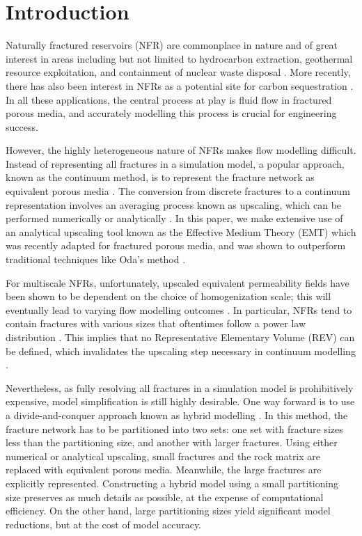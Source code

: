 \documentclass[a4paper]{article}
\begin{document}
\section{Introduction}
Naturally fractured reservoirs (NFR) are commonplace in nature and of great interest in areas including but not limited to hydrocarbon extraction, geothermal resource exploitation, and containment of nuclear waste disposal \cite{Berkowitz2002}. More recently, there has also been 
interest in NFRs as a potential site for carbon sequestration \cite{March2018}. In all these applications, the central process at play is fluid flow in fractured porous media, and accurately modelling this process is crucial for engineering success.

However, the highly heterogeneous nature of NFRs makes flow modelling difficult. Instead of representing all fractures in a simulation model, a popular approach, known as the continuum method, is to represent the fracture network as equivalent porous media \cite{Ezulike2013, Warren1963, Yan2016}. The conversion from discrete fractures to a continuum representation involves an averaging process known as upscaling, which can be performed numerically or analytically \cite{Durlofsky1991,Oda1985,Renard1997,Saevik2013}. In this paper, we make extensive use of an analytical upscaling tool known as the Effective Medium Theory (EMT) which was recently adapted for fractured porous media, and was shown to outperform traditional techniques like Oda's method \cite{Oda1985, Saevik2013, Saevik2014}. 

For multiscale NFRs, unfortunately, upscaled equivalent permeability fields have been shown to be dependent on the choice of homogenization scale; this will eventually lead to varying flow modelling outcomes \cite{Elfeel2013}. In particular, NFRs tend to contain fractures with various sizes that oftentimes follow a power law distribution \cite{Bonnet2001}. This implies that no Representative Elementary Volume (REV) can be defined, which invalidates the upscaling step necessary in continuum modelling \cite{Berkowitz2002}.

Nevertheless, as fully resolving all fractures in a simulation model is prohibitively expensive, model simplification is still highly desirable. One way forward is to use a divide-and-conquer approach known as hybrid modelling \cite{Berkowitz2002}. In this method, the fracture network has to be partitioned into two sets: one set with fracture sizes less than the partitioning size, and another with larger fractures. Using either numerical or analytical upscaling, small fractures and the rock matrix are replaced with equivalent porous media. Meanwhile, the large fractures are explicitly represented. Constructing a hybrid model using a small partitioning size preserves as much details as possible, at the expense of computational efficiency. On the other hand, large partitioning sizes yield significant model reductions, but at the cost of model accuracy.
\end{document}
